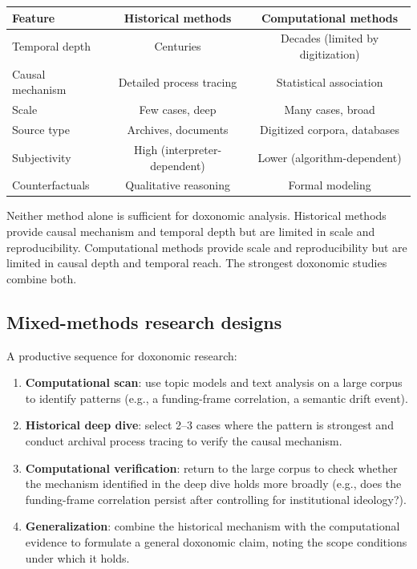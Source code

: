 \begin{center}
\begin{tabular}{lcc}
\toprule
Feature & Historical methods & Computational methods \\
\midrule
Temporal depth & Centuries & Decades (limited by digitization) \\
Causal mechanism & Detailed process tracing & Statistical association \\
Scale & Few cases, deep & Many cases, broad \\
Source type & Archives, documents & Digitized corpora, databases \\
Subjectivity & High (interpreter-dependent) & Lower (algorithm-dependent) \\
Counterfactuals & Qualitative reasoning & Formal modeling \\
\bottomrule
\end{tabular}
\end{center}

Neither method alone is sufficient for doxonomic analysis.
Historical methods provide causal mechanism and temporal depth but are limited in scale and reproducibility.
Computational methods provide scale and reproducibility but are limited in causal depth and temporal reach.
The strongest doxonomic studies combine both.

\subsection{Mixed-methods research designs}

\begin{model}
\label{mod:mixed-methods}
A productive sequence for doxonomic research:
\begin{enumerate}[nosep]
  \item \textbf{Computational scan}: use topic models and text analysis on a large corpus to identify patterns (e.g., a funding-frame correlation, a semantic drift event).
  \item \textbf{Historical deep dive}: select 2--3 cases where the pattern is strongest and conduct archival process tracing to verify the causal mechanism.
  \item \textbf{Computational verification}: return to the large corpus to check whether the mechanism identified in the deep dive holds more broadly (e.g., does the funding-frame correlation persist after controlling for institutional ideology?).
  \item \textbf{Generalization}: combine the historical mechanism with the computational evidence to formulate a general doxonomic claim, noting the scope conditions under which it holds.
\end{enumerate}
\end{model}

